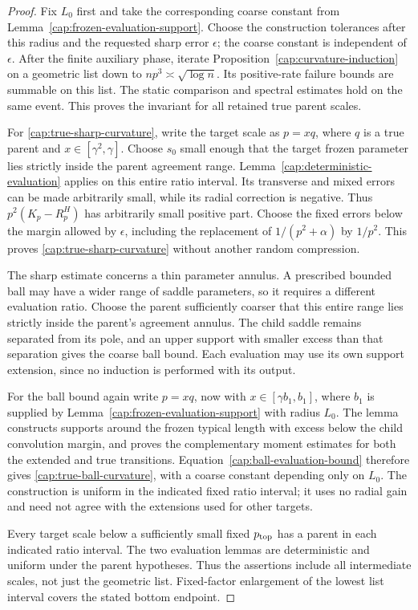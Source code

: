 \begin{proof}
Fix $L_0$ first and take the corresponding coarse constant from
Lemma~\ref{cap:frozen-evaluation-support}. Choose the construction
tolerances after this radius and the requested sharp error $\epsilon$;
the coarse constant is independent of $\epsilon$.
After the finite auxiliary phase, iterate
Proposition~\ref{cap:curvature-induction} on a geometric
list down to $np^3\asymp\sqrt{\log n}$.  Its
positive-rate failure bounds are summable on this list.
The static comparison and spectral estimates hold on
the same event.  This proves the invariant for all
retained true parent scales.

For \eqref{cap:true-sharp-curvature}, write the target scale as $p=xq$,
where $q$ is a true parent and $x\in[\gamma^2,\gamma]$. Choose $s_0$
small enough that the target frozen parameter lies strictly inside the
parent agreement range. Lemma~\ref{cap:deterministic-evaluation} applies
on this entire ratio interval. Its transverse and mixed errors can be
made arbitrarily small, while its radial correction is negative. Thus
$p^2(K_p-R_p^H)$ has arbitrarily small positive part. Choose the fixed
errors below the margin allowed by $\epsilon$, including the replacement
of $1/(p^2+\alpha)$ by $1/p^2$. This proves
\eqref{cap:true-sharp-curvature} without another random compression.

The sharp estimate concerns a thin parameter annulus. A prescribed bounded
ball may have a wider range of saddle parameters, so it requires a different
evaluation ratio. Choose the parent sufficiently coarser that this entire
range lies strictly inside the parent's agreement annulus. The child saddle
remains separated from its pole, and an upper support with smaller excess than
that separation gives the coarse ball bound. Each evaluation may use its own
support extension, since no induction is performed with its output.

For the ball bound again write $p=xq$, now with
$x\in[\gamma b_1,b_1]$, where
$b_1$ is supplied by Lemma~\ref{cap:frozen-evaluation-support} with
radius $L_0$. The lemma constructs supports around the frozen typical
length with excess below the child convolution margin, and proves the
complementary moment estimates for both the extended and true
transitions. Equation~\eqref{cap:ball-evaluation-bound} therefore gives
\eqref{cap:true-ball-curvature}, with a coarse constant depending only on
$L_0$. The construction is uniform in the indicated fixed ratio interval;
it uses no radial gain and need not agree with the extensions used for
other targets.

Every target scale below a sufficiently small fixed $p_{\rm top}$ has a parent
in each indicated ratio interval. The two evaluation lemmas are deterministic
and uniform under the parent hypotheses. Thus the assertions include all
intermediate scales, not just the geometric list. Fixed-factor enlargement of
the lowest list interval covers the stated bottom endpoint. \end{proof}

